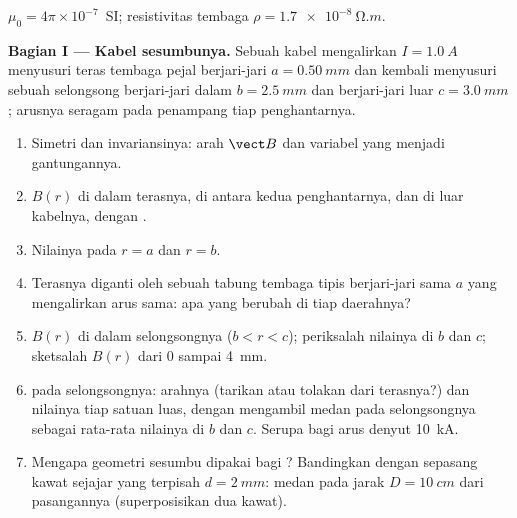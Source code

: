 \begin{problem}
\label{pb:b1:magnetostatics:1}
$\mu_0 = 4\pi \times 10^{-7}$~SI; resistivitas tembaga $\rho = \qty{1.7e-8}{\ohm.m}$.

\medskip
\noindent\textbf{Bagian I --- Kabel sesumbunya.}
Sebuah kabel mengalirkan $I = \qty{1.0}{A}$ menyusuri teras tembaga pejal berjari-jari
$a = \qty{0.50}{mm}$ dan kembali menyusuri sebuah selongsong berjari-jari dalam $b =
\qty{2.5}{mm}$ dan berjari-jari luar $c = \qty{3.0}{mm}$; arusnya seragam
pada penampang tiap penghantarnya.
\begin{enumerate}
  \item Simetri dan invariansinya: arah $\vect B$ dan variabel
        yang menjadi gantungannya.
  \item $B(r)$ di dalam terasnya, di antara kedua penghantarnya, dan di luar
        kabelnya, dengan .
  \item Nilainya pada $r = a$ dan $r = b$.
  \item Terasnya diganti oleh sebuah tabung tembaga tipis berjari-jari sama
        $a$ yang mengalirkan arus sama: apa yang berubah di tiap daerahnya?
  \item $B(r)$ di dalam selongsongnya ($b < r < c$); periksalah nilainya di $b$
        dan $c$; sketsalah $B(r)$ dari $0$ sampai \qty{4}{mm}.
  \item {} pada selongsongnya: arahnya (tarikan atau
        tolakan dari terasnya?) dan nilainya tiap satuan luas, dengan mengambil
        medan pada selongsongnya sebagai rata-rata nilainya di $b$ dan $c$.
        Serupa bagi arus denyut \qty{10}{kA}.
  \item Mengapa geometri sesumbu dipakai bagi ? Bandingkan dengan
        sepasang kawat sejajar yang terpisah $d = \qty{2}{mm}$: medan pada jarak
        $D = \qty{10}{cm}$ dari pasangannya (superposisikan dua kawat).
\end{enumerate}


\end{problem}
